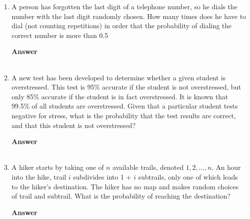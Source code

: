 \documentclass[paper=usletter, fontsize=12pt]{article}
\newcommand{\ans}{\textbf{Answer} \\ \ }
\begin{document}
\begin{enumerate}
        \ans

        \item A person has forgotten the last digit of a telephone number, so
        he dials the number with the last digit randomly chosen. How many times
        does he have to dial (not counting repetitions) in order that the
        probability of dialing the correct number is more than 0.5

        \ans

        \item A new test has been developed to determine whether a given
        student is overstressed. This test is 95\% accurate if the student is
        not overstressed, but only 85\% accurate if the student is in fact
        overstressed. It is known that 99.5\% of all students are overstressed.
        Given that a particular student tests negative for stress, what is the
        probability that the test results are correct, and that this student is
        not overstressed?

        \ans

        \item A hiker starts by taking one of $n$ available trails, denoted $1,
        2, \ldots, n$. An hour into the hike, trail $i$ subdivides into 1 +
        $i$ subtrails, only one of which leads to the hiker’s destination. The
        hiker has no map and makes random choices of trail and subtrail. What
        is the probability of reaching the destination?

        \ans

    \end{enumerate}
\end{document}
